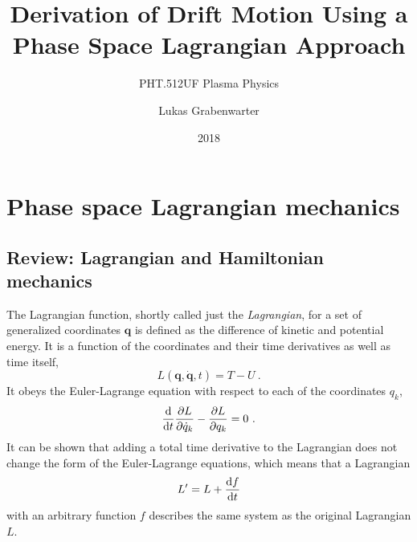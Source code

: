 \documentclass{scrartcl}
\title{Derivation of Drift Motion Using a Phase Space Lagrangian Approach}
\subtitle{\vspace{5mm}PHT.512UF Plasma Physics\vfill}
\author{Lukas Grabenwarter}
\date{2018}
\renewcommand{\vec}[1]{\boldsymbol{#1}}
\newcommand{\lag}{L}
\begin{document}
\maketitle
\thispagestyle{empty}
\newpage

\tableofcontents
\thispagestyle{empty}
\newpage


\section{Phase space Lagrangian mechanics}
\subsection{Review: Lagrangian and Hamiltonian mechanics}\label{sec:review}
The Lagrangian function, shortly called just the \emph{Lagrangian}, for a set of generalized coordinates $\vec{q}$ is defined as the difference of kinetic and potential energy. It is a function of the coordinates and their time derivatives as well as time itself,
\begin{equation*}
\lag(\vec{q},\dot{\vec{q}},t) = T - U   \ .
\end{equation*}
It obeys the Euler-Lagrange equation with respect to each of the coordinates $q_k$,
\begin{equation*}
\dv{t}\pdv{\lag}{\dot{q}_k} - \pdv{\lag}{q_k} = 0 \ .
\end{equation*}
It can be shown that adding a total time derivative to the Lagrangian does not change the form of the Euler-Lagrange equations, which means that a Lagrangian
\begin{equation*}
\lag' = \lag + \dv{f}{t}
\end{equation*}
with an arbitrary function $f$ describes the same system as the original Lagrangian $\lag$.
\end{document}
